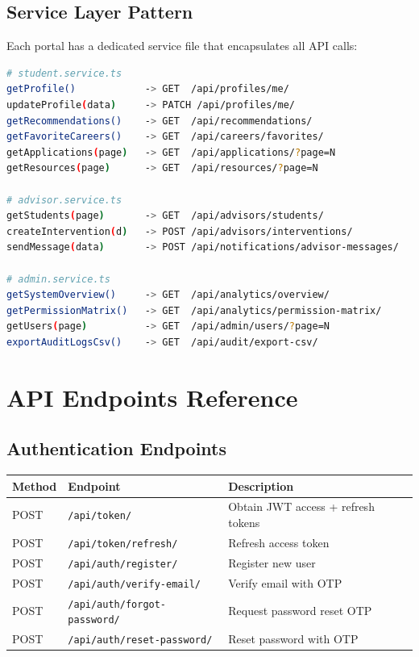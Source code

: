 \documentclass[12pt, a4paper]{article}
\begin{document}
\subsection{Service Layer Pattern}

Each portal has a dedicated service file that encapsulates all API calls:

\begin{lstlisting}[language=bash, caption={Service Method Examples}]
# student.service.ts
getProfile()            -> GET  /api/profiles/me/
updateProfile(data)     -> PATCH /api/profiles/me/
getRecommendations()    -> GET  /api/recommendations/
getFavoriteCareers()    -> GET  /api/careers/favorites/
getApplications(page)   -> GET  /api/applications/?page=N
getResources(page)      -> GET  /api/resources/?page=N

# advisor.service.ts
getStudents(page)       -> GET  /api/advisors/students/
createIntervention(d)   -> POST /api/advisors/interventions/
sendMessage(data)       -> POST /api/notifications/advisor-messages/

# admin.service.ts
getSystemOverview()     -> GET  /api/analytics/overview/
getPermissionMatrix()   -> GET  /api/analytics/permission-matrix/
getUsers(page)          -> GET  /api/admin/users/?page=N
exportAuditLogsCsv()    -> GET  /api/audit/export-csv/
\end{lstlisting}

\newpage

\section{API Endpoints Reference}

\subsection{Authentication Endpoints}

\begin{longtable}{p{1.5cm}p{5.5cm}p{6.5cm}}
\toprule
\textbf{Method} & \textbf{Endpoint} & \textbf{Description} \\
\midrule
\endhead
POST & \texttt{/api/token/} & Obtain JWT access + refresh tokens \\
POST & \texttt{/api/token/refresh/} & Refresh access token \\
POST & \texttt{/api/auth/register/} & Register new user \\
POST & \texttt{/api/auth/verify-email/} & Verify email with OTP \\
POST & \texttt{/api/auth/forgot-password/} & Request password reset OTP \\
POST & \texttt{/api/auth/reset-password/} & Reset password with OTP \\
\bottomrule
\end{longtable}
\end{document}
